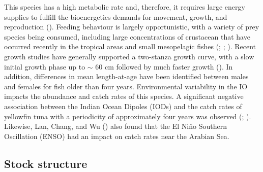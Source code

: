 \documentclass[
]{scrartcl}
\begin{document}
This species has a high metabolic rate and, therefore, it requires large
energy supplies to fulfill the bioenergetics demands for movement,
growth, and reproduction
(). Feeding behaviour is largely opportunistic, with a variety
of prey species being consumed, including large concentrations of
crustacean that have occurred recently in the tropical areas and small
mesopelagic fishes
(; ; ).
Recent growth studies have generally supported a two-stanza growth
curve, with a slow initial growth phase up to \(\sim\) 60 cm followed by
much faster growth (). In addition, differences in mean length-at-age
have been identified between males and females for fish older than four
years. Environmental variability in the IO impacts the abundance and
catch rates of this species. A significant negative association between
the Indian Ocean Dipoles (IODs) and the catch rates of yellowfin tuna
with a periodicity of approximately four years was observed
(; ). Likewise, Lan, Chang, and Wu
() also found
that the El Niño Southern Oscillation (ENSO) had an impact on catch
rates near the Arabian Sea.

\subsection{Stock structure}\label{stock-structure}
\end{document}
